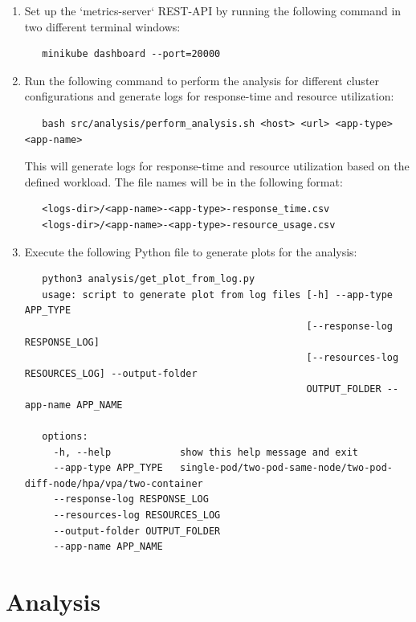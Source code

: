 \documentclass{article}
\begin{document}
\begin{enumerate}
   \item Set up the `metrics-server` REST-API by running the following command in two different terminal windows:
   
   \begin{verbatim}
   minikube dashboard --port=20000
   \end{verbatim}
   
   \item Run the following command to perform the analysis for different cluster configurations and generate logs for response-time and resource utilization:
   
   \begin{verbatim}
   bash src/analysis/perform_analysis.sh <host> <url> <app-type> <app-name>
   \end{verbatim}
   
   This will generate logs for response-time and resource utilization based on the defined workload. The file names will be in the following format:
   
   \begin{verbatim}
   <logs-dir>/<app-name>-<app-type>-response_time.csv
   <logs-dir>/<app-name>-<app-type>-resource_usage.csv
   \end{verbatim}
   
   \item Execute the following Python file to generate plots for the analysis:
   
   \begin{verbatim}
   python3 analysis/get_plot_from_log.py
   usage: script to generate plot from log files [-h] --app-type APP_TYPE
                                                 [--response-log RESPONSE_LOG]
                                                 [--resources-log RESOURCES_LOG] --output-folder
                                                 OUTPUT_FOLDER --app-name APP_NAME

   options:
     -h, --help            show this help message and exit
     --app-type APP_TYPE   single-pod/two-pod-same-node/two-pod-diff-node/hpa/vpa/two-container
     --response-log RESPONSE_LOG
     --resources-log RESOURCES_LOG
     --output-folder OUTPUT_FOLDER
     --app-name APP_NAME
   \end{verbatim}
\end{enumerate}

\section{Analysis}







\end{document}
